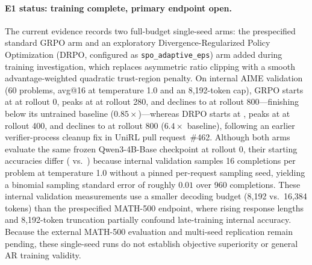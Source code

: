 \documentclass[10pt]{article}
\begin{document}
\paragraph{E1 status: training complete, primary endpoint open.}
The current evidence records two full-budget single-seed arms: the prespecified standard GRPO arm and an exploratory Divergence-Regularized Policy Optimization (DRPO, configured as \texttt{spo\_adaptive\_eps}) arm added during training investigation, which replaces asymmetric ratio clipping with a smooth advantage-weighted quadratic trust-region penalty.
On internal AIME validation (60 problems, avg@16 at temperature 1.0 and an 8,192-token cap), GRPO starts at \EOneGRPOBase{} at rollout 0, peaks at \EOneGRPOPeak{} at rollout 280, and declines to \EOneGRPOFinal{} at rollout 800---finishing below its untrained baseline ($0.85\times$)---whereas DRPO starts at \EOneDRPOBase{}, peaks at \EOneDRPOPeak{} at rollout 400, and declines to \EOneDRPOFinal{} at rollout 800 ($6.4\times$ baseline), following an earlier verifier-process cleanup fix in UniRL pull request~\#462.
Although both arms evaluate the same frozen Qwen3-4B-Base checkpoint at rollout 0, their starting accuracies differ (\EOneGRPOBase{} vs.\ \EOneDRPOBase{}) because internal validation samples 16 completions per problem at temperature 1.0 without a pinned per-request sampling seed, yielding a binomial sampling standard error of roughly $0.01$ over 960 completions.
These internal validation measurements use a smaller decoding budget (8,192 vs.\ 16,384 tokens) than the prespecified MATH-500 endpoint, where rising response lengths and 8,192-token truncation partially confound late-training internal accuracy.
Because the external MATH-500 evaluation and multi-seed replication remain pending, these single-seed runs do not establish objective superiority or general AR training validity.
\end{document}
